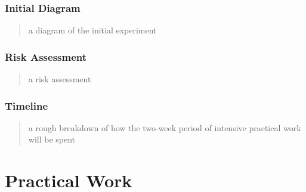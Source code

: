 \documentclass{article}
\begin{document}
\section{Initial Diagram}
\begin{quote}
a diagram of the initial experiment
\end{quote}
\section{Risk Assessment}
\begin{quote}
a risk assessment
\end{quote}

\section{Timeline}
\begin{quote}
a rough breakdown of how the two-week period of intensive practical work will be spent
\end{quote}
\part{Practical Work}
\end{document}
